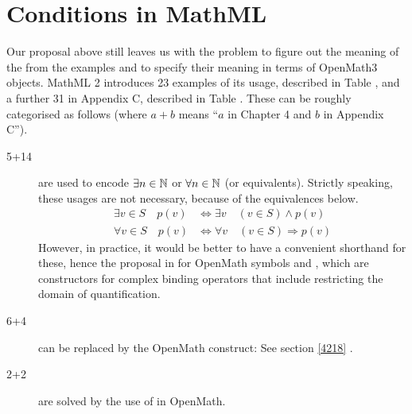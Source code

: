 \documentclass{llncs}
\begin{document}
\section{Conditions in MathML}

Our proposal above still leaves us with the problem to figure out the meaning of the
{} from the examples and to specify their meaning in terms of OpenMath3
objects.  MathML 2 introduces 23 examples of its usage, described in Table ,
and a further 31 in Appendix C, described in Table . These can be roughly
categorised as follows (where $a+b$ means ``$a$ in Chapter 4 and $b$ in Appendix C'').
\begin{description}
\item[5+14]are used to encode $\exists n\in \mathbb{N}$ or $\forall n\in \mathbb{N}$ (or
equivalents). Strictly speaking, these usages are not necessary, because of
the equivalences below.
\begin{eqnarray}
\exists v\in S\quad p(v)&\Leftrightarrow \exists v\quad (v\in S)\land p(v)\\
\forall v\in S\quad p(v)&\Leftrightarrow \forall v\quad (v\in S)\Rightarrow p(v)
\end{eqnarray}
However, in practice, it would be better to have a convenient shorthand for these, hence
the proposal in \cite{DavenportKohlhase2009c} for OpenMath symbols
{} and {}, which are constructors for
complex binding operators that include restricting the domain of quantification.
\item[6+4]can be replaced by the OpenMath {} 
construct\iffull : See section
  \ref{4218}\else{} \cite[\ref{4218}]{DavenportKohlhase2009b}\fi.
\item[2+2]are solved by the use of {} in OpenMath.
\end{description}
\end{document}

